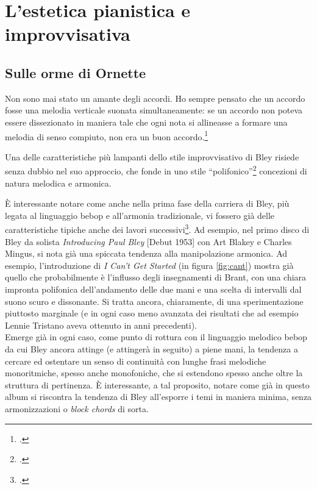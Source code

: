 \chapter{L'estetica pianistica e improvvisativa}
\section{Sulle orme di Ornette}
\begin{fquote}
	Non sono mai stato un amante degli accordi. Ho sempre pensato che un accordo fosse una melodia verticale suonata simultaneamente: se un accordo non poteva essere dissezionato in maniera tale che ogni nota si allineasse a formare una melodia di senso compiuto, non era un buon accordo.\footcite[71]{stopping}
\end{fquote}
Una delle caratteristiche più lampanti dello stile improvvisativo di Bley risiede senza dubbio nel suo approccio, che fonde in uno stile ``polifonico''\footcite[50]{cappelletti} concezioni di natura melodica e armonica. \par
È interessante notare come anche nella prima fase della carriera di Bley, più legata al linguaggio bebop e all'armonia tradizionale, vi fossero già delle caratteristiche tipiche anche dei lavori successivi\footcite[104]{dean}. Ad esempio, nel primo disco di Bley da solista \textit{Introducing Paul Bley} [Debut 1953] con Art Blakey e Charles Mingus, si nota già una spiccata tendenza alla manipolazione armonica. Ad esempio, l'introduzione di \textit{I Can't Get Started} (in figura \ref{fig:cant}) mostra già quello che probabilmente è l'influsso degli insegnamenti di Brant, con una chiara impronta polifonica dell'andamento delle due mani e una scelta di intervalli dal suono scuro e dissonante.
Si tratta ancora, chiaramente, di una sperimentazione piuttosto marginale (e in ogni caso meno avanzata dei risultati che ad esempio Lennie Tristano aveva ottenuto in anni precedenti). \\
Emerge già in ogni caso, come punto di rottura con il linguaggio melodico bebop da cui Bley ancora attinge (e attingerà in seguito) a piene mani, la tendenza a cercare ed ostentare un senso di continuità con lunghe frasi melodiche monoritmiche, spesso anche monofoniche, che si estendono spesso anche oltre la struttura di pertinenza. È interessante, a tal proposito, notare come già in questo album si riscontra la tendenza di Bley all'esporre i temi in maniera minima, senza armonizzazioni o \textit{block chords} di sorta.
